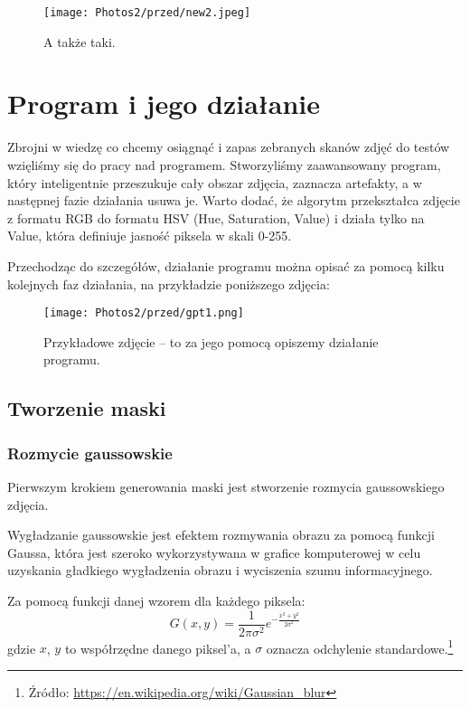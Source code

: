 \documentclass[]{mwart}
\begin{document}
\begin{figure}[H]
    \centering
    \texttt{[image: Photos2/przed/new2.jpeg]}
    \caption{A także taki.}
\end{figure}

\newpage
\section{Program i jego działanie}
Zbrojni w wiedzę co chcemy osiągnąć i zapas zebranych skanów zdjęć do testów wzięliśmy się do pracy
nad programem. Stworzyliśmy zaawansowany program, który inteligentnie przeszukuje cały obszar zdjęcia, zaznacza artefakty,
a w następnej fazie działania usuwa je. Warto dodać, że algorytm przekształca zdjęcie z formatu RGB do formatu HSV (Hue, Saturation, Value) i działa tylko na Value,
która definiuje jasność piksela w skali 0-255.

Przechodząc do szczegółów, działanie programu można opisać za pomocą kilku kolejnych faz działania, na przykładzie poniższego zdjęcia:

\begin{figure}[H]
    \centering
    \texttt{[image: Photos2/przed/gpt1.png]}
    \caption{Przykładowe zdjęcie -- to za jego pomocą opiszemy działanie programu.}
\end{figure}


\subsection{Tworzenie maski}
\subsubsection{Rozmycie gaussowskie}
Pierwszym krokiem generowania maski jest stworzenie rozmycia gaussowskiego zdjęcia.

Wygładzanie gaussowskie jest efektem rozmywania obrazu za pomocą funkcji Gaussa,
która jest szeroko wykorzystywana w grafice komputerowej w celu uzyskania gładkiego
wygładzenia obrazu i wyciszenia szumu informacyjnego.

Za pomocą funkcji danej wzorem dla każdego piksela:
\begin{equation}
    G(x, y) = \frac{1}{2 \pi \sigma^2}e^{- \frac{x^2+y^2}{2\sigma^2}}
\end{equation}
gdzie $x$, $y$ to współrzędne danego piksel'a, a $\sigma$ oznacza odchylenie standardowe.\footnote{Źródło: \url{https://en.wikipedia.org/wiki/Gaussian_blur}}
\end{document}
